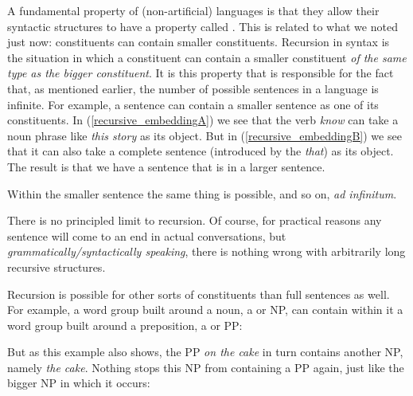 \documentclass{article}
\begin{document}
A fundamental property of  (non-artificial) languages is that they allow their syntactic structures to have a property called .
This is related to what we noted just now: constituents can contain smaller constituents. Recursion in syntax is the situation in which a constituent can contain a smaller constituent \emph{of the same type as the bigger constituent}.
It is this property that is responsible for the fact that, as mentioned earlier, the number of possible sentences in a language is infinite.
For example, a sentence can contain a smaller sentence as one of its constituents.
In (\ref{recursive_embeddingA}) we see that the verb \emph{know} can take a noun phrase like \emph{this story} as its object.
But in (\ref{recursive_embeddingB}) we see that it can also take a complete sentence (introduced by the  \emph{that}) as its object.
The result is that we have a sentence that is  in a larger sentence.
\begin{exe}
\end{exe}
Within the smaller sentence the same thing is possible, and so on, \emph{ad infinitum}.

\begin{exe}
\end{exe}
There is no principled limit to recursion. Of course, for practical reasons any sentence will come to an end in actual conversations, but \emph{grammatically/syntactically speaking}, there is nothing wrong with arbitrarily long recursive structures.

Recursion is possible for other sorts of constituents than full sentences as well. 
For example, a word group built around a noun, a  or NP, can contain within it a word group built around a preposition, a  or PP:
\begin{exe}
\end{exe}
But as this example also shows, the PP \emph{on the cake} in turn contains another NP, namely \emph{the cake}.
Nothing stops this NP from containing a PP again, just like the bigger NP in which it occurs:
\begin{exe}
    \label{cherry_on_cake}
\end{exe}
\end{document}
